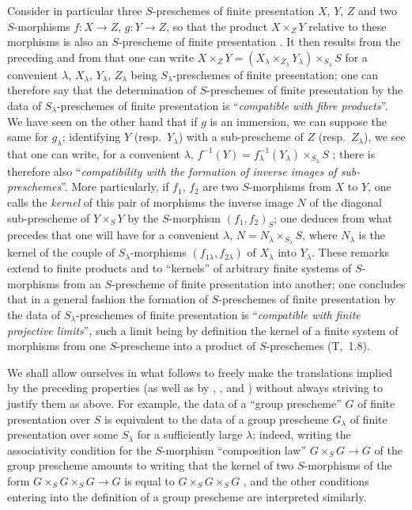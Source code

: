 \begin{env}[8.8.3]
Consider in particular three $S$-preschemes of finite presentation $X$, $Y$, $Z$ and two $S$-morphisms $f:X\to Z$, $g:Y\to Z$, so that the product $X\times_Z Y$ relative to these morphisms is also an $S$-prescheme of finite presentation .
It then results from the preceding and from  that one can write $X\times_Z Y=(X_\lambda\times_{Z_\lambda}Y_\lambda)\times_{S_\lambda}S$ for a convenient $\lambda$, $X_\lambda$, $Y_\lambda$, $Z_\lambda$ being $S_\lambda$-preschemes of finite presentation; one can therefore say that the determination of $S$-preschemes of finite presentation by the data of $S_\lambda$-preschemes of finite presentation is ``\emph{compatible with fibre products}''.
We have seen on the other hand  that if $g$ is an immersion, we can suppose the same for $g_\lambda$; identifying $Y$ (resp.\ $Y_\lambda$) with a sub-prescheme of $Z$ (resp.\ $Z_\lambda$), we see that one can write, for a convenient $\lambda$, $f^{-1}(Y)=f_\lambda^{-1}(Y_\lambda)\times_{S_\lambda}S$ ;
there is therefore also ``\emph{compatibility with the formation of inverse images of sub-preschemes}''.
More particularly, if $f_1$, $f_2$ are two $S$-morphisms from $X$ to $Y$, one calls the \emph{kernel} of this pair of morphisms the inverse image $N$ of the diagonal sub-prescheme of $Y\times_S Y$ by the $S$-morphism $(f_1,f_2)_S$; one deduces from what precedes that one will have for a convenient $\lambda$, $N=N_\lambda\times_{S_\lambda}S$, where $N_\lambda$ is the kernel of the couple of $S_\lambda$-morphisms $(f_{1\lambda},f_{2\lambda})$ of $X_\lambda$ into $Y_\lambda$.
These remarks extend to finite products and to ``kernels'' of arbitrary finite systems of $S$-morphisms from an $S$-prescheme of finite presentation into
another; one concludes that in a general fashion the formation of $S$-preschemes of finite presentation by the data of $S_\lambda$-preschemes of finite presentation is ``\emph{compatible with finite projective limits}'', such a limit being by definition the kernel of a finite system of morphisms from one $S$-prescheme into a product of $S$-preschemes (T,~1.8).

We shall allow ourselves in what follows to freely make the translations implied by the preceding properties (as well as by , , and ) without always striving to justify them as above.
For example, the data of a ``group prescheme'' $G$ of finite presentation over $S$ is equivalent to the data of a group prescheme $G_\lambda$ of finite presentation over some $S_\lambda$ for a sufficiently large $\lambda$; indeed, writing the associativity condition for the $S$-morphism ``composition law'' $G\times_S G\to G$ of the group prescheme amounts to writing that the kernel of two $S$-morphisms of the form $G\times_S G\times_S G\to G$ is equal to $G\times_S G\times_S G$ , and the other conditions entering into the definition of a group prescheme are interpreted similarly.
\end{env}

